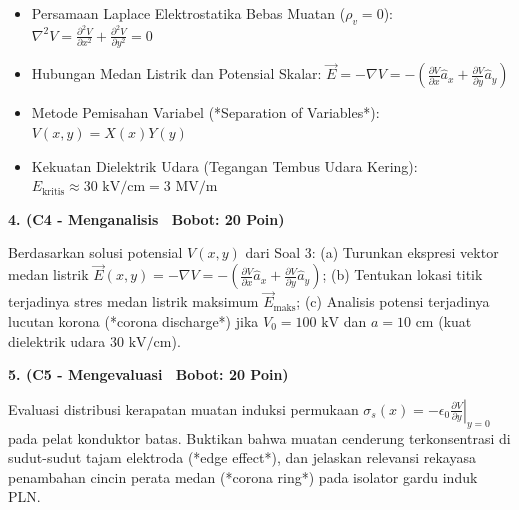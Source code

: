 \documentclass[10pt,a4paper]{article}
\begin{document}
\vfill

\begin{tcolorbox}[colback=unibblue!3,colframe=unibblue,colbacktitle=unibblue,coltitle=white,boxrule=0.6pt,arc=2pt,left=6pt,right=6pt,top=3pt,bottom=3pt,title=\textbf{\scriptsize FORMULA RUJUKAN TEKNIS \& STANDAR INDUSTRI TERKAIT}]
  \scriptsize
  \begin{itemize}[leftmargin=*, nosep]
  \item Persamaan Laplace Elektrostatika Bebas Muatan ($\rho_v = 0$): $\nabla^2 V = \frac{\partial^2 V}{\partial x^2} + \frac{\partial^2 V}{\partial y^2} = 0$
  \item Hubungan Medan Listrik dan Potensial Skalar: $\vec{E} = -\nabla V = -\left(\frac{\partial V}{\partial x}\hat{a}_x + \frac{\partial V}{\partial y}\hat{a}_y\right)$
  \item Metode Pemisahan Variabel (*Separation of Variables*): $V(x,y) = X(x) Y(y)$
  \item Kekuatan Dielektrik Udara (Tegangan Tembus Udara Kering): $E_{\text{kritis}} \approx 30\text{ kV/cm} = 3\text{ MV/m}$
\end{itemize}
\end{tcolorbox}

\newpage

\par
\vspace{1mm}

\noindent\textbf{4. (C4 - Menganalisis \textbar\ Bobot: 20 Poin)}\par\vspace{0.8mm}
{\footnotesize Berdasarkan solusi potensial $V(x,y)$ dari Soal 3: (a) Turunkan ekspresi vektor medan listrik $\vec{E}(x,y) = -\nabla V = -\left(\frac{\partial V}{\partial x}\hat{a}_x + \frac{\partial V}{\partial y}\hat{a}_y\right)$; (b) Tentukan lokasi titik terjadinya stres medan listrik maksimum $\vec{E}_{\text{maks}}$; (c) Analisis potensi terjadinya lucutan korona (*corona discharge*) jika $V_0 = 100\text{ kV}$ dan $a = 10\text{ cm}$ (kuat dielektrik udara $30\text{ kV/cm}$).}\par

\vspace{3.5mm}

\noindent\textbf{5. (C5 - Mengevaluasi \textbar\ Bobot: 20 Poin)}\par\vspace{0.8mm}
{\footnotesize Evaluasi distribusi kerapatan muatan induksi permukaan $\sigma_s(x) = -\epsilon_0 \left. \frac{\partial V}{\partial y} \right|_{y=0}$ pada pelat konduktor batas. Buktikan bahwa muatan cenderung terkonsentrasi di sudut-sudut tajam elektroda (*edge effect*), dan jelaskan relevansi rekayasa penambahan cincin perata medan (*corona ring*) pada isolator gardu induk PLN.}\par
\end{document}
